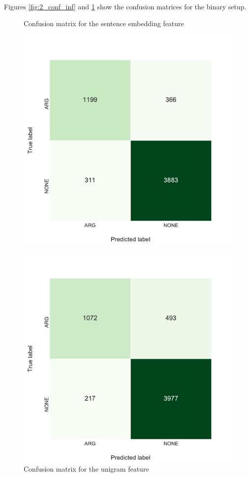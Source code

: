 Figures \ref{fig:2_conf_inf} and \ref{fig:2_conf_uni} show the confusion matrices for the binary setup. 
\begin{figure}[h]
    \begin{minipage}{.5\linewidth}
   \caption{Confusion matrix for the sentence embedding feature} 
    \label{fig:2_conf_inf}
 \centering
	\includegraphics[width=1\textwidth]{images/experiments/conf-InferSent_True}
  \end{minipage} \hfill
    \begin{minipage}{.5\linewidth}
  
     \caption{Confusion matrix for the unigram feature} 
       \label{fig:2_conf_uni}
 \centering
	\includegraphics[width=1\textwidth]{images/experiments/conf-Unigrams_True}
    \end{minipage} 
\end{figure}
